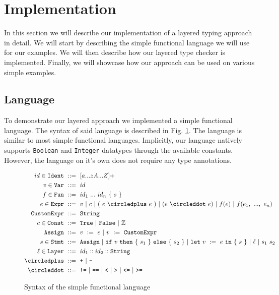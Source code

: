 \section{Implementation}
\label{sec:implementation}

In this section we will describe our implementation of a layered typing approach in detail. We will start by describing the simple functional language we will use for our examples. We will then describe how our layered type checker is implemented. Finally, we will showcase how our approach can be used on various simple examples.

\subsection{Language}
\label{ssec:language}

To demonstrate our layered approach we implemented a simple functional language. The syntax of said language is described in Fig. \ref{fig:lang}. The language is similar to most simple functional languages. Implicitly, our language natively supports \texttt{Boolean} and \texttt{Integer} datatypes through the available constants. However, the language on it's own does not require any type annotations.

\begin{figure}[ht!]
\begin{align*}
	id \in \texttt{Ident}\ 	&::=\ [a...zA...Z]+ \\
	v \in \texttt{Var}\ 	&::=\ id \\
	f \in \texttt{Fun}\ 	&::=\ id_1\ ...\ id_n\ \{\ s\ \}\\
	e \in \texttt{Expr}\ 	&::=\ v\ |\ c\ |\ (\ e\ \circledplus\ e\ )\ |\ (e\ \circleddot\ e)\ |\ f(e)\ |\ f(e_1,\ ...,\ e_n)  \\
	\texttt{CustomExpr}\ 	&::=\ \texttt{String}\\
	c \in \texttt{Const}\ 	&::=\ \texttt{True}\ |\ \texttt{False}\ |\ \mathbb{Z} \\
	\texttt{Assign}\ 	&::=\ v\ :=\ e\ |\ v\ :=\ \texttt{CustomExpr}\ \\
	s \in \texttt{Stmt}\ 	&::=\ \texttt{Assign}\ |\ \texttt{if}\ v\ \texttt{then}\ \lbrace\ s_1\ \rbrace\ \texttt{else}\ \lbrace\ s_2\ \rbrace\ |\ \texttt{let}\ v\ :=\ e\ \texttt{in}\ \lbrace\ s\ \rbrace\ |\ \ell\ |\ s_1\ s_2\ \\
	\ell \in \texttt{Layer}\ 	&::=\ id_1::id_2::\texttt{String} \\
	\circledplus\ 		&::=\ \texttt{+}\ |\ \texttt{-} \\
	\circleddot\ 		&::=\ \texttt{!=}\ |\ \texttt{==}\ |\ \texttt{<} \ |\ \texttt{>} \ |\ \texttt{<=} \ |\ \texttt{>=} \\
\end{align*}
\caption{Syntax of the simple functional language}
\label{fig:lang}
\end{figure}

